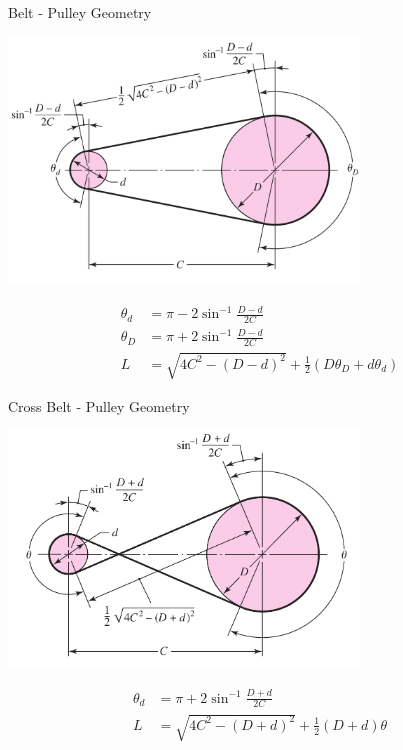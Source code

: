\documentclass[10pt, svgnames]{beamer}
\begin{document}
\begin{frame}[label={sec:org16ace9f}]{Belt - Pulley Geometry}
\begin{center}
\includegraphics[width=0.7\textwidth]{./pictures/belt-pulley-geometry.png}
\end{center}
\vspace{-0.5cm}
\begin{align*}
    \theta_d &= \pi - 2 \sin^{-1} \frac{D - d}{2C} \\
    \theta_D &= \pi + 2 \sin^{-1} \frac{D - d}{2C} \\
    L &= \sqrt{ 4C^2 - (D - d)^2 } + \frac{1}{2}(D \theta_D + d \theta_d)
\end{align*}
\end{frame}

\begin{frame}[label={sec:org9e33eab}]{Cross Belt - Pulley Geometry}
\begin{center}
\includegraphics[width=0.7\textwidth]{./pictures/cross-belt-pulley-geometry.png}
\end{center}
\vspace{-0.5cm}
\begin{align*}
    \theta_d &= \pi + 2 \sin^{-1} \frac{D + d}{2C} \\
    L &= \sqrt{ 4C^2 - (D + d)^2 } + \frac{1}{2}(D + d)\theta
\end{align*}
\end{frame}
\end{document}
